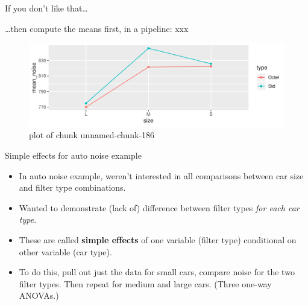 \documentclass[ignorenonframetext,]{beamer}
\newenvironment{Shaded}{\begin{snugshade}}{\end{snugshade}}
\newcommand{\DataTypeTok}[1]{\textcolor[rgb]{0.13,0.29,0.53}{#1}}
\newcommand{\KeywordTok}[1]{\textcolor[rgb]{0.13,0.29,0.53}{\textbf{#1}}}
\newcommand{\NormalTok}[1]{#1}
\newcommand{\OperatorTok}[1]{\textcolor[rgb]{0.81,0.36,0.00}{\textbf{#1}}}
\newcommand{\StringTok}[1]{\textcolor[rgb]{0.31,0.60,0.02}{#1}}
\begin{document}
\begin{frame}[fragile]{If you don't like that\ldots}
\protect\hypertarget{if-you-dont-like-that}{}

\ldots then compute the means first, in a pipeline: xxx

\footnotesize

\begin{Shaded}
\end{Shaded}

\begin{figure}
\centering
\includegraphics{figure/unnamed-chunk-186-1.pdf}
\caption{plot of chunk unnamed-chunk-186}
\end{figure}

\normalsize

\end{frame}

\begin{frame}{Simple effects for auto noise example}
\protect\hypertarget{simple-effects-for-auto-noise-example}{}

\begin{itemize}
\item
  In auto noise example, weren't interested in all comparisons between
  car size and filter type combinations.
\item
  Wanted to demonstrate (lack of) difference between filter types
  \emph{for each car type}.
\item
  These are called \textbf{simple effects} of one variable (filter type)
  conditional on other variable (car type).
\item
  To do this, pull out just the data for small cars, compare noise for
  the two filter types. Then repeat for medium and large cars. (Three
  one-way ANOVAs.)
\end{itemize}

\end{frame}
\end{document}
